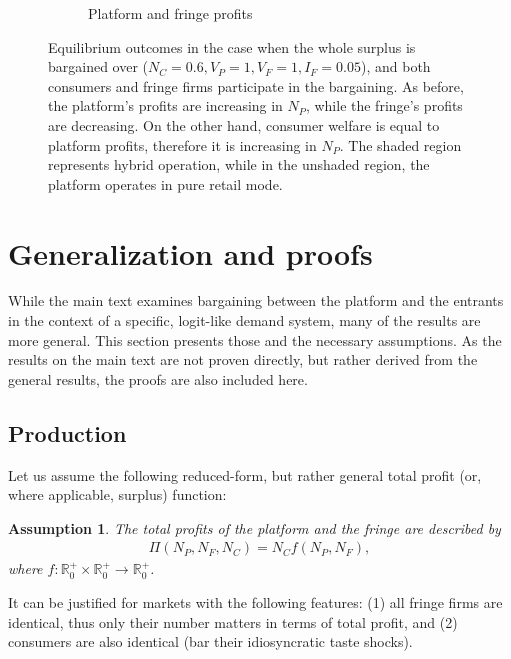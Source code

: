 \documentclass[a4paper]{article}
\newtheorem{assumption}{Assumption}
\begin{document}
\begin{figure}
\begin{subfigure}[b]{0.45\textwidth}
        \caption{Platform and fringe profits}
        \label{fig:profits_full_surplus_two_sided}
    \end{subfigure}
    \caption{Equilibrium outcomes in the case when the whole surplus is bargained over ($N_C = 0.6, V_P = 1, V_F = 1, I_F = 0.05$), and both consumers and fringe firms participate in the bargaining. As before, the platform's profits are increasing in $N_P$, while the fringe's profits are decreasing. On the other hand, consumer welfare is equal to platform profits, therefore it is increasing in $N_P$. The shaded region represents hybrid operation, while in the unshaded region, the platform operates in pure retail mode.}
    \label{fig:equilibrium_full_surplus_two_sided}
\end{figure}



\section{Generalization and proofs}
\label{sec:more_general}

While the main text examines bargaining between the platform and the entrants in the context of a specific, logit-like demand system, many of the results are more general.
This section presents those and the necessary assumptions.
As the results on the main text are not proven directly, but rather derived from the general results, the proofs are also included here.

\subsection{Production}
\label{sec:more_general_production}

Let us assume the following reduced-form, but rather general total profit (or, where applicable, surplus) function:
\begin{assumption}
    \label{ass:identical_fringe}
    The total profits of the platform and the fringe are described by 
    \begin{align*}
        \Pi(N_P, N_F, N_C) = N_C f(N_P, N_F),
    \end{align*}
    where $f: \mathbb{R}^+_0 \times \mathbb{R}^+_0 \to \mathbb{R}^+_0$.
\end{assumption}
It can be justified for markets with the following features: (1) all fringe firms are identical, thus only their number matters in terms of total profit, and (2) consumers are also identical (bar their idiosyncratic taste shocks).
\end{document}
